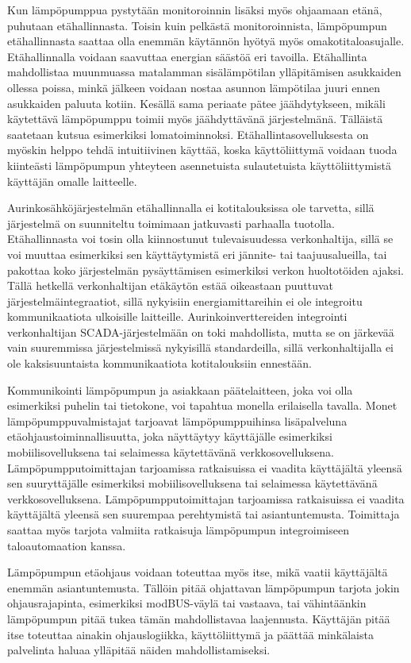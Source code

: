   Kun lämpöpumppua pystytään monitoroinnin lisäksi myös ohjaamaan etänä, puhutaan etähallinnasta. Toisin kuin pelkästä monitoroinnista, lämpöpumpun etähallinnasta saattaa olla enemmän käytännön hyötyä myös omakotitaloasujalle. Etähallinnalla voidaan saavuttaa energian säästöä eri tavoilla. Etähallinta mahdollistaa muunmuassa matalamman sisälämpötilan ylläpitämisen asukkaiden ollessa poissa, minkä jälkeen voidaan nostaa asunnon lämpötilaa juuri ennen asukkaiden paluuta kotiin. Kesällä sama periaate pätee jäähdytykseen, mikäli käytettävä lämpöpumppu toimii myös jäähdyttävänä järjestelmänä. Tälläistä saatetaan kutsua esimerkiksi lomatoiminnoksi. Etähallintasovelluksesta on myöskin helppo tehdä intuitiivinen käyttää, koska käyttöliittymä voidaan tuoda kiinteästi lämpöpumpun yhteyteen asennetuista sulautetuista käyttöliittymistä käyttäjän omalle laitteelle.

  Aurinkosähköjärjestelmän etähallinnalla ei kotitalouksissa ole tarvetta, sillä järjestelmä on suunniteltu toimimaan jatkuvasti parhaalla tuotolla. Etähallinnasta voi tosin olla kiinnostunut tulevaisuudessa verkonhaltija, sillä se voi muuttaa esimerkiksi sen käyttäytymistä eri jännite- tai taajuusalueilla, tai pakottaa koko järjestelmän pysäyttämisen esimerkiksi verkon huoltotöiden ajaksi. Tällä hetkellä verkonhaltijan etäkäytön estää oikeastaan puuttuvat järjestelmäintegraatiot, sillä nykyisiin energiamittareihin ei ole integroitu kommunikaatiota ulkoisille laitteille. Aurinkoinverttereiden integrointi verkonhaltijan \gls{SCADA}-järjestelmään on toki mahdollista, mutta se on järkevää vain suuremmissa järjestelmissä nykyisillä standardeilla, sillä verkonhaltijalla ei ole kaksisuuntaista kommunikaatiota kotitalouksiin ennestään. 

  Kommunikointi lämpöpumpun ja asiakkaan päätelaitteen, joka voi olla esimerkiksi puhelin tai tietokone, voi tapahtua monella erilaisella tavalla. Monet lämpöpumppuvalmistajat tarjoavat lämpöpumppuihinsa lisäpalveluna etäohjaustoiminnallisuutta, joka näyttäytyy käyttäjälle esimerkiksi mobiilisovelluksena tai selaimessa käytettävänä verkkosovelluksena. Lämpöpumpputoimittajan tarjoamissa ratkaisuissa ei vaadita käyttäjältä yleensä sen suuryttäjälle esimerkiksi mobiilisovelluksena tai selaimessa käytettävänä verkkosovelluksena. Lämpöpumpputoimittajan tarjoamissa ratkaisuissa ei vaadita käyttäjältä yleensä sen suurempaa perehtymistä tai asiantuntemusta. Toimittaja saattaa myös tarjota valmiita ratkaisuja lämpöpumpun integroimiseen taloautomaation kanssa.

  Lämpöpumpun etäohjaus voidaan toteuttaa myös itse, mikä vaatii käyttäjältä enemmän asiantuntemusta. Tällöin pitää ohjattavan lämpöpumpun tarjota jokin ohjausrajapinta, esimerkiksi modBUS-väylä tai vastaava, tai vähintäänkin lämpöpumpun pitää tukea tämän mahdollistavaa laajennusta. Käyttäjän pitää itse toteuttaa ainakin ohjauslogiikka, käyttöliittymä ja päättää minkälaista palvelinta haluaa ylläpitää näiden mahdollistamiseksi.


